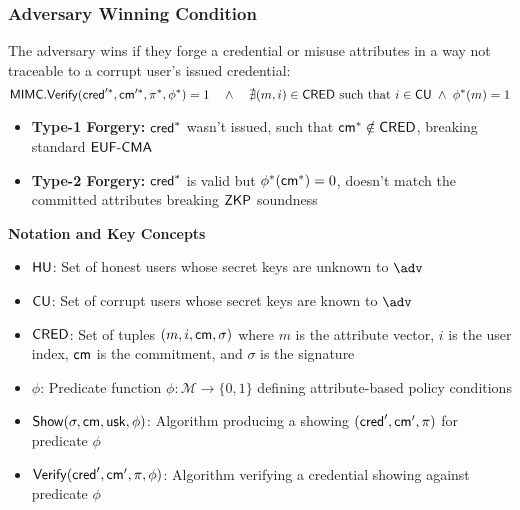 \subsubsection{Adversary Winning Condition}
The adversary wins if they forge a credential or misuse attributes in a way not traceable to a corrupt user’s issued credential:
\[
\mathsf{MIMC.Verify}(\mathsf{cred}'^*, \mathsf{cm}'^*, \pi^*, \phi^*) = 1 \quad \wedge \quad \nexists (m, i) \in \mathsf{CRED} \text{ such that } i \in \mathsf{CU} \; \wedge \; \phi^*(m) = 1
\]

\begin{itemize}
    \item \textbf{Type-1 Forgery: } $\mathsf{cred}^*$ wasn't issued, such that $\mathsf{cm}^* \notin \mathsf{CRED}$, breaking standard $\mathsf{EUF\text{-}CMA}$
    \item \textbf{Type-2 Forgery: } $\mathsf{cred}^*$ is valid but $\phi^*(\mathsf{cm}^*) = 0$, doesn't match the committed attributes breaking $\mathsf{ZKP}$ soundness
\end{itemize}




\noindent\textbf{Notation and Key Concepts}
\begin{itemize}
    \item $\mathsf{HU}$: Set of honest users whose secret keys are unknown to $\adv$
    \item $\mathsf{CU}$: Set of corrupt users whose secret keys are known to $\adv$
    \item $\mathsf{CRED}$: Set of tuples $(m, i, \mathsf{cm}, \sigma)$ where $m$ is the attribute vector, $i$ is the user index, $\mathsf{cm}$ is the commitment, and $\sigma$ is the signature
    \item $\phi$: Predicate function $\phi: \mathcal{M} \rightarrow \{0,1\}$ defining attribute-based policy conditions
    \item $\mathsf{Show}(\sigma, \mathsf{cm}, \mathsf{usk}, \phi)$: Algorithm producing a showing $(\mathsf{cred}', \mathsf{cm}', \pi)$ for predicate $\phi$
    \item $\mathsf{Verify}(\mathsf{cred}', \mathsf{cm}', \pi, \phi)$: Algorithm verifying a credential showing against predicate $\phi$
\end{itemize} 

